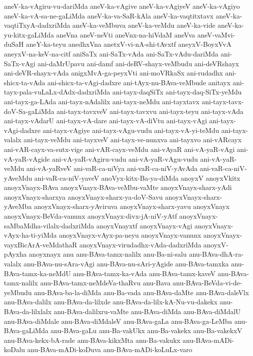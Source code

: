 {aneV-ka-vAgiru-vu-dariMda
aneV-ka-vAgive
aneV-ka-vAgiyeV
aneV-ka-vAgiyo
aneV-ka-vA-sa-ne-gaLiMda
aneV-ka-va-SaR-kAla
aneV-ka-vaqtitxtavx
aneV-ka-vaqtiTxyA-dadxriMda
aneV-ka-veMbuva
aneV-ka-veMdu
aneV-ka-vide
aneV-ka-yu-kitx-gaLiMda
aneVna
aneV-neVti
aneVnx-na-hiVdaM
aneVva
aneV-vaMvi-duSaH
aneY-ka-teyu
anedhxVna
anetxV-vi-nA-shi-tAvxtf
aneyxV-BoyxVvA
aneyxV-na-keV-na-citf
aniSaTx
ani-SaTx-vAda
ani-SaTx-vAdu-dariMda
ani-SaTx-vAgi
ani-daMrUpavu
ani-damf
ani-deRV-shayx-veMbudu
ani-deVRshayx
ani-deVR-shayx-vAda
anigxMvA-ga-peyxVti
ani-moVRkaSx
ani-rudadhx
ani-shicx-ta-vAda
ani-shicx-ta-vAgi-dadxre
ani-tAyx-nu-BAva-veMbude
anitayx
ani-tayx-pala-vuLaLx-dAdx-dadxriMda
ani-tayx-daqSiTx
ani-tayx-daq-SiTx-yeMdu
ani-tayx-ga-LAda
ani-tayx-nAdalilx
ani-tayx-neMdu
ani-tayxtavx
ani-tayx-tavx-doV-Sa-gaLiMda
ani-tayx-tavxveV
ani-tayx-tavxvu
ani-tayx-teyu
ani-tayx-vAda
ani-tayx-vAdarU
ani-tayx-vA-dare
ani-tayx-vA-diVtu
ani-tayx-vAgi
ani-tayx-vAgi-dadxre
ani-tayx-vAgiye
ani-tayx-vAgu-vudu
ani-tayx-vA-yi-teMdu
ani-tayx-valalx
ani-tayx-veMdu
ani-tayxveV
ani-tayx-ve-nunxva
ani-tayxvo
ani-vARcayx
ani-vAR-cayx-va-sutx-vige
ani-vAR-cayx-veMdu
ani-vAyaR
ani-vA-yaR-vAgi
ani-vA-yaR-vAgide
ani-vA-yaR-vAgiru-vudu
ani-vA-yaR-vAgu-vudu
ani-vA-yaR-veMdu
ani-vA-yaRveV
ani-vaR-ca-niVya
ani-vaR-ca-niV-yAvAda
ani-vaR-ca-niV-yAveMdu
ani-vaR-ca-niV-yaveV
anoVyx-kitx-Ba-ya-diMda
anoyxV
anoyxVkitx
anoyxVnayx-BAva
anoyxVnayx-BAva-veMbu-vaMte
anoyxVnayx-sharx-yAdi
anoyxVnayx-sharxya
anoyxVnayx-sharx-ya-doV-Savu
anoyxVnayx-sharx-yAveMba
anoyxVnayx-sharx-yAviruva
anoyxVnayx-sharx-yavu
anoyxVnayx
anoyxVnayx-BeVda-vanunx
anoyxVnayx-divx-jA-niV-yAtf
anoyxVnayx-saMbaMdha-vilalx-dadxriMda
anoyxVnayxtf
anoyxVnayx-vAgi
anoyxVnayx-vAyx-ha-ti-yiMda
anoyxVnayx-vAyx-pa-neyu
anoyxVnayx-vanunx
anoyxVnayx-vayxBicArA-veMdathaR
anoyxVnayx-virudadhx-vAda-dadxriMda
anoyxV-pAyxha
anoyxnayx
anu
anu-BAva-tamx-nalilx
anu-Ba-ni-salu
anu-BAva-dhA-ra-valalx
anu-BAva-nu-sAra-vAgi
anu-BAva-nu-sAri-yAgide
anu-BAva-tamxka
anu-BAva-tamx-ka-neMdU
anu-BAva-tamx-ka-vAda
anu-BAva-tamx-kaveV
anu-BAva-tamx-nalilx
anu-BAva-tamx-neMdeVa-thaRvu
anu-Bava
anu-BAva-BeVda-vi-de-yeMbudu
anu-BAva-ba-la-diMda
anu-Ba-vada
anu-BAva-daMte
anu-BAva-daleVlx
anu-BAva-dalilx
anu-BAva-da-lilxde
anu-BAva-da-lilx-kA-Nu-vu-dakekx
anu-BAva-da-lilxlalx
anu-BAva-dalilxru-vaMte
anu-BAva-diMda
anu-BAva-diMdalU
anu-BAva-diMdale
anu-BAva-diMdaleV
anu-BAva-gaLa
anu-BAva-ga-LeMba
anu-BAva-gaLiMda
anu-BAva-gaLu
anu-Ba-vakUkx
anu-Ba-vakekx
anu-Ba-vakekxV
anu-BAva-kekx-bA-rade
anu-BAva-kikxMta
anu-Ba-vakukx
anu-BAva-mADi-koDalu
anu-BAva-mADi-koDuva
anu-BAva-mADi-koLuLx-varo
}
